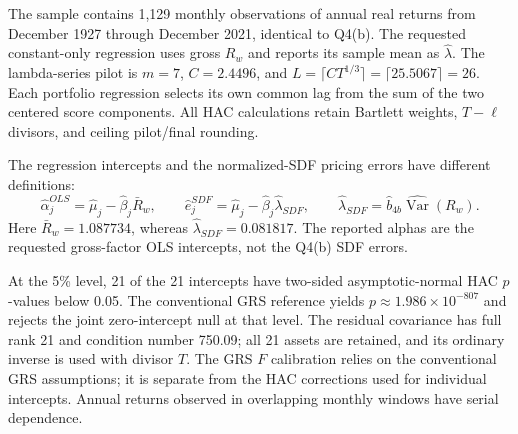 The sample contains 1,129 monthly observations of annual real returns from December 1927 through December 2021, identical to Q4(b).
The requested constant-only regression uses gross $R_w$ and reports its sample mean as $\hat\lambda$.
The lambda-series pilot is $m=7$, $C=2.4496$,
and $L=\lceil CT^{1/3}\rceil=\lceil 25.5067\rceil=26$.
Each portfolio regression selects its own common lag from the sum of the two centered score components.
All HAC calculations retain Bartlett weights, $T-\ell$ divisors, and ceiling pilot/final rounding.

The regression intercepts and the normalized-SDF pricing errors have different definitions:
\[
\hat\alpha_j^{OLS}=\hat\mu_j-\hat\beta_j\bar R_w,\qquad
\hat e_j^{SDF}=\hat\mu_j-\hat\beta_j\hat\lambda_{SDF},\qquad
\hat\lambda_{SDF}=\hat b_{4b}\widehat{\operatorname{Var}}(R_w).
\]
Here $\bar R_w=1.087734$, whereas $\hat\lambda_{SDF}=0.081817$.
The reported alphas are the requested gross-factor OLS intercepts, not the Q4(b) SDF errors.

At the 5\% level, 21 of the 21 intercepts have two-sided asymptotic-normal HAC $p$-values below 0.05.
The conventional GRS reference yields $p\approx 1.986\times10^{-807}$
and rejects the joint zero-intercept null at that level.
The residual covariance has full rank 21 and condition number 750.09;
all 21 assets are retained, and its ordinary inverse is used with divisor $T$.
The GRS $F$ calibration relies on the conventional GRS assumptions; it is separate from
the HAC corrections used for individual intercepts. Annual returns observed in overlapping monthly windows have serial dependence.
